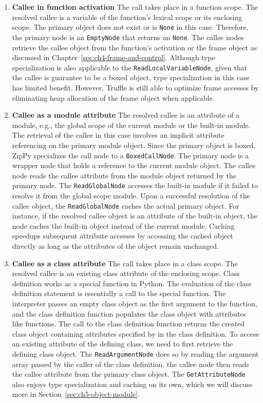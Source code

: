 \begin{enumerate}

\item \textbf{Callee in function activation}
The call takes place in a function scope.
The resolved callee is a variable of the function's lexical scope or its enclosing scope.
The primary object does not exist or is \texttt{None} in this case.
Therefore, the primary node is an \texttt{EmptyNode} that returns an \texttt{None}.
The callee nodes retrieve the callee object from the function's activation or the frame object as discussed in Chapter~\ref{sec:ch4-frame-and-control}.
Although type specialization is also applicable to the \texttt{ReadLocalVariableNode}, given that the callee is guarantee to be a boxed object, type specialization in this case has limited benefit.
However, Truffle is still able to optimize frame accesses by eliminating heap allocation of the frame object when applicable.

\item \textbf{Callee as a module attribute}
The resolved callee is an attribute of a module, e.g., the global scope of the current module or the built-in module.
The retrieval of the callee in this case involves an implicit attribute referencing on the primary module object.
Since the primary object is boxed, ZipPy specializes the call node to a \texttt{BoxedCallNode}.
The primary node is a wrapper node that holds a reference to the current module object.
The callee node reads the callee attribute from the module object returned by the primary node.
The \texttt{ReadGlobalNode} accesses the built-in module if it failed to resolve it from the global scope module.
Upon a successful resolution of the callee object, the \texttt{ReadGlobalNode} caches the actual primary object.
For instance, if the resolved callee object is an attribute of the built-in object, the node caches the built-in object instead of the current module.
Caching speedups subsequent attribute accesses by accessing the cached object directly as long as the attributes of the object remain unchanged.

\item \textbf{Callee as a class attribute}
The call takes place in a class scope.
The resolved callee is an existing class attribute of the enclosing scope.
Class definition works as a special function in Python.
The evaluation of the class definition statement is essentially a call to the special function.
The interpreter passes an empty class object as the first argument to the function, and the class definition function populates the class object with attributes like functions.
The call to the class definition function returns the created class object containing attributes specified by in the class definition.
To access an existing attribute of the defining class, we need to first retrieve the defining class object.
The \texttt{ReadArgumentNode} does so by reading the argument array passed by the caller of the class definition.
the callee node then reads the callee attribute from the primary class object.
The \texttt{GetAttributeNode} also enjoys type specialization and caching on its own, which we will discuss more in Section~\ref{sec:ch5-object-module}.

\end{enumerate}

